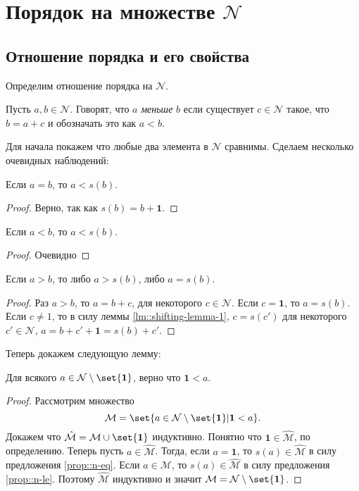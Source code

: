 \documentclass{article}
\begin{document}
\section{Порядок на множестве \texorpdfstring{$\mathcal{N}$}{N}}
\subsection{Отношение порядка и его свойства}
\noindent Определим отношение порядка на \(\mathcal{N}\).
\begin{definition}
    Пусть \(a, b \in \mathcal{N}\). Говорят, что \(a\) \textit{меньше} \(b\) если существует \(c \in \mathcal{N}\) такое, что \(b = a + c\) и обозначать это как \(a < b\).
\end{definition}
\noindent Для начала покажем что любые два элемента в \(\mathcal{N}\) сравнимы. Сделаем несколько очевидных наблюдений:
\begin{proposition}
    \label{prop::n-eq}
    Если \(a = b\), то \(a < s(b)\).
\end{proposition}
\begin{proof}
    Верно, так как \(s(b) = b + \mathbf{1}\).
\end{proof}
\begin{proposition}
    \label{prop::n-le}
    Если \(a < b\), то \(a < s(b)\). 
\end{proposition}
\begin{proof}
    Очевидно
\end{proof}
\begin{proposition}
    \label{prop::n-ge}
    Если \(a > b\), то либо \(a > s(b)\), либо \(a = s(b)\).
\end{proposition}
\begin{proof}
    Раз \(a > b\), то \(a = b + c\), для некоторого \(c \in \mathcal{N}\). Если \(c = \mathbf{1}\), то \(a = s(b)\). Если \(c \neq 1\), то в силу леммы \ref{lm::shifting-lemma-1}, \(c = s(c')\) для некоторого \(c' \in \mathcal{N}\), \ie \(a = b + c' + \mathbf{1} = s(b) + c'\).
\end{proof}
\noindent Теперь докажем следующую лемму:
\begin{lemma}
    \label{lm::unit-is-smallest}
    Для всякого \(a \in \mathcal{N} \setminus \set{\mathbf{1}}\), верно что \(\mathbf{1} < a\).
\end{lemma}
\begin{proof}
    Рассмотрим множество 
    \[
        \mathcal{M} = \set{a \in \mathcal{N} \setminus \set{\mathbf{1}} | \mathbf{1} < a}.
    \]
    Докажем что \(\hat{\mathcal{M}} = \mathcal{M} \cup \set{\mathbf{1}}\) индуктивно. Понятно что \(\mathbf{1} \in \hat{\mathcal{M}}\), по определению. Теперь пусть \(a \in \hat{\mathcal{M}}\). Тогда, если \(a = \mathbf{1}\), то \(s(a) \in \hat{\mathcal{M}}\) в силу предложения \ref{prop::n-eq}. Если \(a \in \mathcal{M}\), то \(s(a) \in \hat{\mathcal{M}}\) в силу предложения \ref{prop::n-le}. Поэтому \(\hat{\mathcal{M}}\) индуктивно и значит \(\mathcal{M} = \mathcal{N} \setminus \set{\mathbf{1}}\).
\end{proof}
\end{document}
